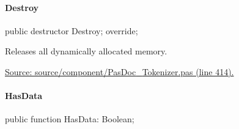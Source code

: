 \documentclass{report}
\newif\ifpdf
\begin{document}
\paragraph*{Destroy}\hspace*{\fill}

\label{PasDoc_Tokenizer.TTokenizer-Destroy}
\begin{list}{}{
\setlength{\itemindent}{0cm}
\setlength{\listparindent}{0cm}
\setlength{\leftmargin}{\evensidemargin}
\addtolength{\leftmargin}{\tmplength}
\settowidth{\labelsep}{X}
\addtolength{\leftmargin}{\labelsep}
\setlength{\labelwidth}{\tmplength}
}
\item[\textbf{Declaration}\hfill]
\ifpdf
\begin{flushleft}
\fi
\begin{ttfamily}
public destructor Destroy; override;\end{ttfamily}

\ifpdf
\end{flushleft}
\fi

\par
\item[\textbf{Description}]
Releases all dynamically allocated memory.\par
\href{https://github.com/pasdoc/pasdoc/blob/master/source/component/PasDoc_Tokenizer.pas#L414}{Source: source/component/PasDoc{\_}Tokenizer.pas (line 414).}

\end{list}
\paragraph*{HasData}\hspace*{\fill}

\label{PasDoc_Tokenizer.TTokenizer-HasData}
\begin{list}{}{
\setlength{\itemindent}{0cm}
\setlength{\listparindent}{0cm}
\setlength{\leftmargin}{\evensidemargin}
\addtolength{\leftmargin}{\tmplength}
\settowidth{\labelsep}{X}
\addtolength{\leftmargin}{\labelsep}
\setlength{\labelwidth}{\tmplength}
}
\item[\textbf{Declaration}\hfill]
\ifpdf
\begin{flushleft}
\fi
\begin{ttfamily}
public function HasData: Boolean;\end{ttfamily}

\ifpdf
\end{flushleft}
\fi

\end{list}
\end{document}
